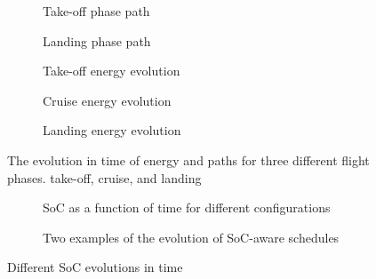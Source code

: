   \begin{figure}[p]
    \centering
    \selectfont
    \footnotesize
    \begin{subfigure}[c]{0.475\textwidth}
      \centering
      
      \caption{Take-off phase path}
      \label{fig:takeoff-path}
      \vspace{3ex}
    \end{subfigure}
    \begin{subfigure}[c]{0.475\textwidth}
      \centering
      
      \vspace*{3ex}
      \caption{Landing phase path}
      \label{fig:landing-path}
      \vspace{3ex}
    \end{subfigure}
    \quad
    \begin{subfigure}[c]{0.34\textwidth}
      \centering
      
      \caption{Take-off energy evolution}
      \label{fig:takeoff-energy}
    \end{subfigure}
    \begin{subfigure}[c]{0.32\textwidth}
      \centering
      
      \caption{Cruise energy evolution}
      \label{fig:cruise-energy}
    \end{subfigure}
    \begin{subfigure}[c]{0.30\textwidth}
      \centering
      
      \caption{Landing energy evolution}
      \label{fig:landing-energy}
    \end{subfigure}
    \caption{The evolution in time of energy and paths for three different flight phases. take-off, cruise, and landing}
    \label{fig:path-energy}
  \end{figure}

  \begin{figure}[p]
    \centering
    \selectfont
    \footnotesize
    \begin{subfigure}[c]{0.4\textwidth}
      \centering
      
      \caption{SoC as a function of time for different configurations}
      \label{fig:soc-configuration}
    \end{subfigure}
    \begin{subfigure}[c]{0.4\textwidth}
      \centering
      
      \caption{Two examples of the evolution of SoC-aware schedules}
      \label{fig:soc-schedule}
    \end{subfigure}
    \caption{Different SoC evolutions in time}
    \label{fig:soc-evolution}
  \end{figure}

